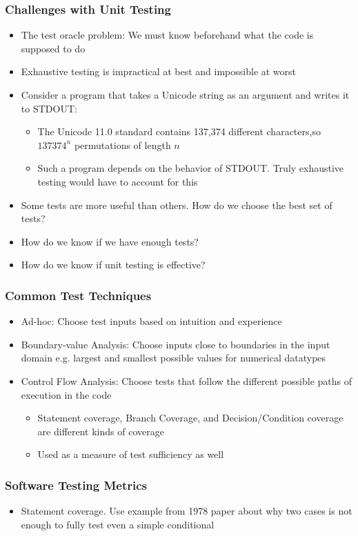 \documentclass{beamer}
\begin{document}
\begin{frame}
\frametitle{Challenges with Unit Testing}
\begin{itemize}
	\item The test oracle problem: We must know beforehand what the code is supposed to do
	\item Exhaustive testing is impractical at best and impossible at worst
	\item Consider a program that takes a Unicode string as an argument and writes it to STDOUT:
	\begin{itemize}
		\item The Unicode 11.0 standard contains 137,374 different characters\cite{unicodestd},so $137374^n$ permutations of length $n$
		\item Such a program depends on the behavior of STDOUT. Truly exhaustive testing would have to account for this
	\end{itemize}
	\item Some tests are more useful than others. How do we choose the best set of tests?
	\item How do we know if we have enough tests?
	\item How do we know if unit testing is effective?
\end{itemize}
\end{frame}

\begin{frame}
\frametitle{Common Test Techniques}
\begin{itemize}
	\item Ad-hoc: Choose test inputs based on intuition and experience
	\item Boundary-value Analysis: Choose inputs close to boundaries in the input domain e.g. largest and smallest possible values for numerical datatypes
	\item Control Flow Analysis: Choose tests that follow the different possible paths of execution in the code
	\begin{itemize}
		\item Statement coverage, Branch Coverage, and Decision/Condition coverage are different kinds of coverage
		\item Used as a measure of test sufficiency as well
	\end{itemize}
\end{itemize}
\end{frame}

\begin{frame}
\frametitle{Software Testing Metrics}
\begin{itemize}
	\item Statement coverage. Use example from 1978 paper about why two cases is not enough to fully test even a simple conditional
\end{itemize}
\end{frame}
\end{document}
